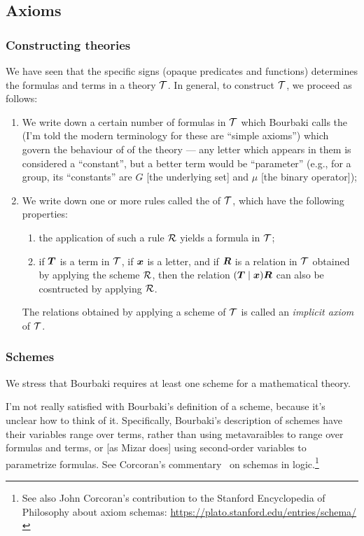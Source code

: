 \subsection{Axioms}

\subsubsection{Constructing theories}\label{subsec:axioms:constructing-theories}
We have seen that the specific signs (opaque predicates and functions)
determines the formulas and terms in a theory $\mathcal{T}$. In general,
to construct $\mathcal{T}$, we proceed as follows:
\begin{enumerate}
\item We write down a certain number of formulas in $\mathcal{T}$ which
  Bourbaki calls the  (I'm told the modern
  terminology for these are ``simple axioms'') which govern the
  behaviour of  of the theory --- any letter which
  appears in them is considered a ``constant'', but a better term would
  be ``parameter'' (e.g., for a group, its ``constants'' are $G$ [the
    underlying set] and $\mu$ [the binary operator]);
\item We write down one or more rules called the  of
  $\mathcal{T}$, which have the following properties:
  \begin{enumerate}
  \item the application of such a rule $\mathcal{R}$ yields a formula in $\mathcal{T}$;
  \item if $\boldsymbol{T}$ is a term in $\mathcal{T}$, if
    $\boldsymbol{x}$ is a letter, and if $\boldsymbol{R}$ is a
    relation in $\mathcal{T}$ obtained by applying the scheme
    $\mathcal{R}$, then the relation
    $(\boldsymbol{T}\mid\boldsymbol{x})\boldsymbol{R}$ can also be
    cosntructed by applying $\mathcal{R}$.
  \end{enumerate}
  The relations obtained by applying a scheme of $\mathcal{T}$ is called
  an \emph{implicit axiom} of $\mathcal{T}$.
\end{enumerate}

\subsubsection{Schemes}
We stress that Bourbaki requires at least one scheme for a mathematical
theory.

I'm not really satisfied with Bourbaki's definition of a scheme, because
it's unclear how to think of it. Specifically, Bourbaki's description of
schemes have their variables range over terms, rather than using
metavaraibles to range over formulas and terms, or [as Mizar does] using
second-order variables to parametrize formulas. See Corcoran's
commentary~\cite{corcoran2006schemata} on schemas in logic.\footnote{See
also John Corcoran's contribution to the Stanford Encyclopedia of
Philosophy about axiom schemas: \url{https://plato.stanford.edu/entries/schema/}}

